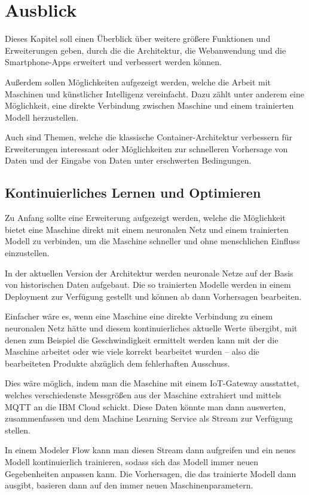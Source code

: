 \chapter{Ausblick}
\label{ch:ausblick}
Dieses Kapitel soll einen Überblick über weitere größere Funktionen und Erweiterungen geben, durch die die Architektur,
die Webanwendung und die Smartphone-Apps erweitert und verbessert werden können.

Außerdem sollen Möglichkeiten aufgezeigt werden, welche die Arbeit mit Maschinen und künstlicher Intelligenz
vereinfacht. Dazu zählt unter anderem eine Möglichkeit, eine direkte Verbindung zwischen Maschine und einem trainierten
Modell herzustellen.

Auch sind Themen, welche die klassische Container-Architektur verbessern für Erweiterungen interessant oder
Möglichkeiten zur schnelleren Vorhersage von Daten und der Eingabe von Daten unter erschwerten Bedingungen.

\section{Kontinuierliches Lernen und Optimieren}
Zu Anfang sollte eine Erweiterung aufgezeigt werden, welche die Möglichkeit bietet eine Maschine direkt mit einem
neuronalen Netz und einem trainierten Modell zu verbinden, um die Maschine schneller und ohne menschlichen Einfluss
einzustellen.

In der aktuellen Version der Architektur werden neuronale Netze auf der Basis von historischen Daten aufgebaut. Die so
trainierten Modelle werden in einem Deployment zur Verfügung gestellt und können ab dann Vorhersagen bearbeiten.

Einfacher wäre es, wenn eine Maschine eine direkte Verbindung zu einem neuronalen Netz hätte und diesem kontinuierliches
aktuelle Werte übergibt, mit denen zum Beispiel die Geschwindigkeit ermittelt werden kann mit der die Maschine arbeitet
oder wie viele korrekt bearbeitet wurden -- also die bearbeiteten Produkte abzüglich dem fehlerhaften Ausschuss.

Dies wäre möglich, indem man die Maschine mit einem IoT-Gateway ausstattet, welches verschiedenste Messgrößen aus der
Maschine extrahiert und mittels MQTT an die IBM Cloud schickt. Diese Daten könnte man dann auswerten, zusammenfassen
und dem Machine Learning Service als Stream zur Verfügung stellen.

In einem Modeler Flow kann man diesen Stream dann aufgreifen und ein neues Modell kontinuierlich trainieren, sodass sich
das Modell immer neuen Gegebenheiten anpassen kann. Die Vorhersagen, die das trainierte Modell dann ausgibt, basieren
dann auf den immer neuen Maschinenparametern.

